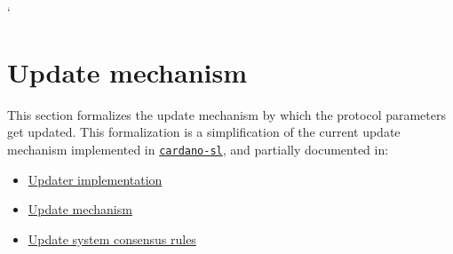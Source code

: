 \newcommand{\UProp}{\ensuremath{\type{UProp}}}
\newcommand{\UPropId}{\ensuremath{\type{UpId}}}
\newcommand{\UPropSD}{\ensuremath{\type{UpSD}}}
\newcommand{\ProtVer}{\ensuremath{\type{ProtVer}}}
\newcommand{\ProtPm}{\ensuremath{\type{Ppm}}}
\newcommand{\Rpus}{\ensuremath{\type{Rpus}}}
\newcommand{\UPVEnv}{\ensuremath{\type{UPVEnv}}}
\newcommand{\UPVState}{\ensuremath{\type{UPVState}}}
\newcommand{\UPLEnv}{\ensuremath{\type{UPLEnv}}}
\newcommand{\UPLState}{\ensuremath{\type{UPLState}}}
\newcommand{\UPREnv}{\ensuremath{\type{UPREnv}}}
\newcommand{\UPRState}{\ensuremath{\type{UPRState}}}
\newcommand{\Vote}{\ensuremath{\type{Vote}}}
\newcommand{\VREnv}{\ensuremath{\type{VREnv}}}
\newcommand{\VRState}{\ensuremath{\type{VRState}}}
\newcommand{\VEnv}{\ensuremath{\type{VEnv}}}
\newcommand{\VState}{\ensuremath{\type{VState}}}
\newcommand{\BVREnv}{\ensuremath{\type{BVREnv}}}
\newcommand{\BVRState}{\ensuremath{\type{BVRState}}}
\newcommand{\ApName}{\ensuremath{\type{ApName}}}
\newcommand{\SWVer}{\ensuremath{\type{SWVer}}}
\newcommand{\ApVer}{\ensuremath{\type{ApVer}}}

\newcommand{\upSize}[1]{\ensuremath{\fun{upSize}~\var{#1}}}
\newcommand{\upPV}[1]{\ensuremath{\fun{upPV}~\var{#1}}}
\newcommand{\upId}[1]{\ensuremath{\fun{upId}~\var{#1}}}
\newcommand{\upSig}[1]{\ensuremath{\fun{upSig}~\var{#1}}}
\newcommand{\upSigData}[1]{\ensuremath{\fun{upSigData}~\var{#1}}}
\newcommand{\upIssuer}[1]{\ensuremath{\fun{upIssuer}~\var{#1}}}
\newcommand{\upParams}[1]{\ensuremath{\fun{upParams}~\var{#1}}}
\newcommand{\upSwVer}[1]{\ensuremath{\fun{upSwVer}~\var{#1}}}
\newcommand{\vCaster}[1]{\ensuremath{\fun{vCaster}~\var{#1}}}
\newcommand{\vPropId}[1]{\ensuremath{\fun{vPropId}~\var{#1}}}
\newcommand{\vSig}[1]{\ensuremath{\fun{vSig}~\var{#1}}}


\lstMakeShortInline[columns=fixed]`

\section{Update mechanism}
\label{sec:update}

This section formalizes the update mechanism by which the protocol parameters
get updated. This formalization is a simplification of the current update
mechanism implemented in
\href{https://github.com/input-output-hk/cardano-sl/}{\texttt{cardano-sl}}, and
partially documented in:
\begin{itemize}
\item \href{https://cardanodocs.com/technical/updater/}{Updater implementation}
\item \href{https://cardanodocs.com/cardano/update-mechanism/}{Update mechanism}
\item
  \href{https://github.com/input-output-hk/cardano-sl/blob/2a19d8ce2941b8e60f0208a5198943ec2ada1fd4/docs/block-processing/us.md}{Update system consensus rules}
\end{itemize}

